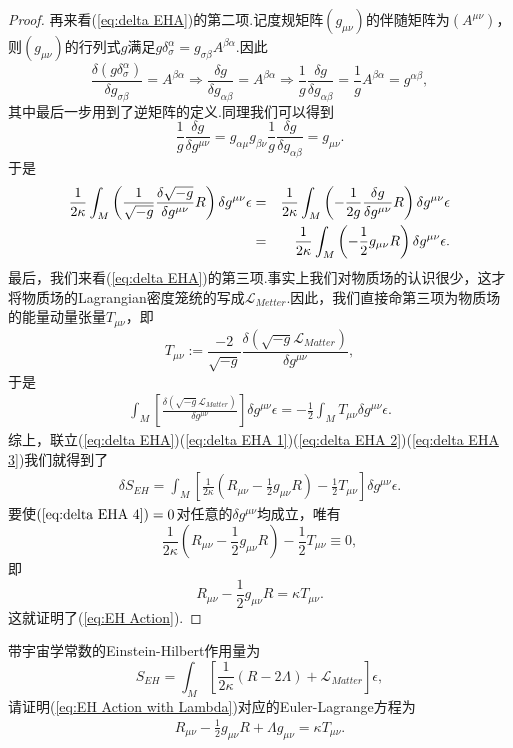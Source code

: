 \begin{proof}
    再来看(\ref{eq:delta EHA})的第二项.记度规矩阵$(g_{\mu\nu})$的伴随矩阵为$(A^{\mu\nu})$，则$(g_{\mu\nu})$的行列式$g$满足$g\delta_\sigma^\alpha=g_{\sigma\beta}A^{\beta\alpha}$.因此
    $$\frac{\delta \left(g\delta_\sigma^\alpha\right)}{\delta g_{\sigma\beta}}=A^{\beta\alpha}\Rightarrow\frac{\delta g}{\delta g_{\alpha\beta}}=A^{\beta\alpha}\Rightarrow\frac{1}{g}\frac{\delta g}{\delta g_{\alpha\beta}}=\frac{1}{g}A^{\beta\alpha}=g^{\alpha\beta},$$
    其中最后一步用到了逆矩阵的定义.同理我们可以得到
    $$\frac{1}{g}\frac{\delta g}{\delta g^{\mu\nu}}=g_{\alpha\mu}g_{\beta\nu}\frac{1}{g}\frac{\delta g}{\delta g_{\alpha\beta}}=g_{\mu\nu}.$$
    于是
    \begin{eqnarray}\label{eq:delta EHA 2}
        \frac{1}{2\kappa}\int_M\left(\frac{1}{\sqrt{-g}}\frac{\delta\sqrt{-g}}{\delta g^{\mu\nu}}R\right)\delta g^{\mu\nu}\epsilon&=&\frac{1}{2\kappa}\int_M\left(-\frac{1}{2g}\frac{\delta g}{\delta g^{\mu\nu}}R\right)\delta g^{\mu\nu}\epsilon\notag\\
        &=&\frac{1}{2\kappa}\int_M\left(-\frac{1}{2}g_{\mu\nu}R\right)\delta g^{\mu\nu}\epsilon.
    \end{eqnarray}
    最后，我们来看(\ref{eq:delta EHA})的第三项.事实上我们对物质场的认识很少，这才将物质场的Lagrangian密度笼统的写成$\mathcal{L}_{Metter}$.因此，我们直接命第三项为物质场的能量动量张量$T_{\mu\nu}$，即
    $$T_{\mu\nu}:=\frac{-2}{\sqrt{-g}}\frac{\delta\left(\sqrt{-g}\mathcal{L} _{Matter}\right)}{\delta g^{\mu\nu}},$$
    于是
    \begin{eqnarray}\label{eq:delta EHA 3}
        \int_M\left[\frac{\delta\left(\sqrt{-g}\mathcal{L}_{Matter}\right)}{\delta g^{\mu\nu}}\right]\delta g^{\mu\nu}\epsilon=-\frac{1}{2}\int_MT_{\mu\nu}\delta g^{\mu\nu}\epsilon.
    \end{eqnarray}
    综上，联立(\ref{eq:delta EHA})(\ref{eq:delta EHA 1})(\ref{eq:delta EHA 2})(\ref{eq:delta EHA 3})我们就得到了
    \begin{eqnarray}\label{eq:delta EHA 4}
        \delta S_{EH}=\int_M\left[\frac{1}{2\kappa}\left(R_{\mu\nu}-\frac{1}{2}g_{\mu\nu}R\right)-\frac{1}{2}T_{\mu\nu}\right]\delta g^{\mu\nu}\epsilon.
    \end{eqnarray}
    要使$(\ref{eq:delta EHA 4})=0$对任意的$\delta g^{\mu\nu}$均成立，唯有
    $$\frac{1}{2\kappa}\left(R_{\mu\nu}-\frac{1}{2}g_{\mu\nu}R\right)-\frac{1}{2}T_{\mu\nu}\equiv0,$$
    即
    $$R_{\mu\nu}-\frac{1}{2}g_{\mu\nu}R=\kappa T_{\mu\nu}.$$
    这就证明了(\ref{eq:EH Action}).
\end{proof}

带宇宙学常数的Einstein-Hilbert作用量为
\begin{equation}\label{eq:EH Action with Lambda}
    S_{EH}=\int_M\left[\frac{1}{2\kappa}\left(R-2\Lambda\right)+\mathcal{L} _{Matter}\right]\epsilon,
\end{equation}
请证明(\ref{eq:EH Action with Lambda})对应的Euler-Lagrange方程为
\begin{eqnarray}\label{eq:Field Equation with Lambda}
    R_{\mu\nu}-\frac{1}{2}g_{\mu\nu}R+\Lambda g_{\mu\nu}=\kappa T_{\mu\nu}.
\end{eqnarray}
